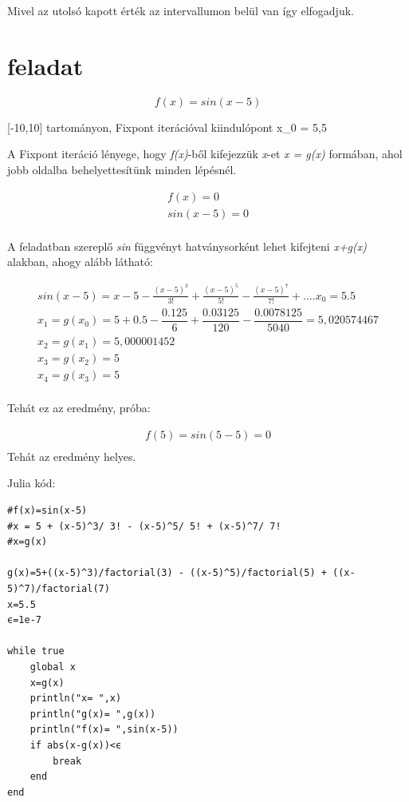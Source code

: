 \documentclass{article}
\begin{document}
Mivel az utolsó kapott érték az intervallumon belül van így elfogadjuk.


\section{feladat}
\begin{equation}
f(x)= sin(x-5)
\end{equation}

[-10,10] tartományon, Fixpont iterációval kiindulópont x_0 = 5,5

A Fixpont iteráció lényege, hogy \textit{f(x)}-ből kifejezzük \textit{x}-et \textit{x = g(x)} formában, ahol jobb oldalba behelyettesítünk minden lépésnél. 

\begin{multline}
f(x)=0\\
sin(x-5)=0\\
\end{multline}

A feladatban szereplő \textit{sin} függvényt hatványsorként lehet kifejteni \textit{x+g(x)} alakban, ahogy alább látható:


\begin{multline}
sin(x-5)=x-5-\frac{(x-5)^{3}}{3!}+\frac{(x-5)^{5}}{5!} - \frac{(x-5)^{7}}{7!} + ....
x_{0} = 5.5\\
x_{1} = g(x_0) = 5 + 0.5-\dfrac{0.125}{6}+\dfrac{0.03125}{120}-\dfrac{0.0078125}{5040} = 5,020574467\\
x_2 = g(x_1) = 5,000001452\\
x_3 = g(x_2) = 5\\
x_4 = g(x_3) = 5\\
\end{multline}

Tehát ez az eredmény, próba:

\begin{multline}
f(5) = sin(5-5) = 0\\
\end{multline}
Tehát az eredmény helyes.

Julia kód:

\begin{verbatim}
#f(x)=sin(x-5)
#x = 5 + (x-5)^3/ 3! - (x-5)^5/ 5! + (x-5)^7/ 7!
#x=g(x)

g(x)=5+((x-5)^3)/factorial(3) - ((x-5)^5)/factorial(5) + ((x-5)^7)/factorial(7)
x=5.5
ϵ=1e-7

while true
    global x
    x=g(x)
    println("x= ",x)
    println("g(x)= ",g(x))
    println("f(x)= ",sin(x-5))
    if abs(x-g(x))<ϵ
        break
    end
end
\end{verbatim}
\end{document}
